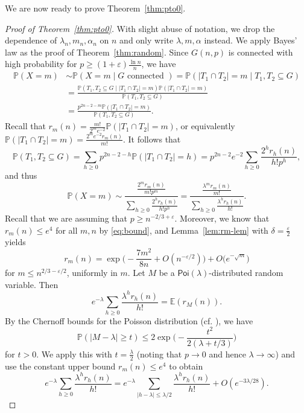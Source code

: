 \documentclass[a4paper,12pt,reqno]{amsart}
\theoremstyle{remark}
\newcommand{\Ex}{\mathbb{E}}
\newcommand{\IP}{\mathbb{P}}
\newcommand{\Poi}{\mathsf{Poi}}
\newcommand{\ssq}{\subseteq}
\newcommand{\ga}{\alpha}
\newcommand{\gep}{\varepsilon}
\newcommand{\gd}{\delta}
\newcommand{\gl}{\lambda}
\begin{document}
We are now ready to prove Theorem~\ref{thm:pto0}.

\begin{proof}[Proof of Theorem~\ref{thm:pto0}]
With slight abuse of notation, we drop the dependence of $\gl_n,m_n,\ga_n$ on $n$ and only write $\gl,m,\ga$ instead.
    We apply Bayes' law as the proof of Theorem~\ref{thm:random}. Since $G(n,p)$ is connected with high probability for $p\geq (1+\gep)\frac{\ln n}{n}$, we have
 \begin{align*}
  \IP(X=m) 
  &\sim \IP(X=m\mid G\text{ connected })
   = \IP(|T_1\cap T_2|=m \mid T_1,T_2\ssq G)\\
  &=\frac{\IP(T_1,T_2\ssq G \mid |T_1\cap T_2|=m)\IP(|T_1\cap T_2|=m)}{\IP(T_1,T_2\ssq G)}\\
  &= \frac{p^{2n-2-m}\IP(|T_1\cap T_2|=m)}{\IP(T_1,T_2\ssq G)}.
 \end{align*}
Recall that $r_m(n) = \frac{m!}{2^m e^{-2}} \IP(|T_1\cap T_2|=m)$, or equivalently $\IP(|T_1\cap T_2|=m) = \frac{2^m e^{-2}r_m(n)}{m!}$. It follows that
\[\IP(T_1,T_2\ssq G) = \sum_{h \geq 0} p^{2n-2-h} \IP(|T_1\cap T_2|=h) = p^{2n-2}e^{-2} \sum_{h \geq 0} \frac{2^h r_h(n)}{h!p^h},\]
and thus
\begin{equation}\label{eq:PX=m}
\IP(X=m) \sim \frac{\frac{2^m r_m(n)}{m!p^m}}{\sum_{h \geq 0} \frac{2^h r_h(n)}{h!p^h}} = \frac{\frac{\gl^m r_m(n)}{m!}}{\sum_{h \geq 0} \frac{\gl^h r_h(n)}{h!}}.
\end{equation}
 Recall that we are assuming that $p \geq n^{-2/3+\gep}$. Moreover, we know that $r_m(n)\leq e^4$ for all $m,n$ by \eqref{eq:bound}, and Lemma~\ref{lem:rm-lem} with $\gd = \frac{\gep}{2}$ yields
\begin{equation}\label{eq:rmn-asy}
    r_m(n) = \exp \Big( {-}\frac{7m^2}{8n} + O(n^{-\gep/2}) \Big) + O\big(e^{-\sqrt{m}}\big)
\end{equation}
for $m \leq n^{2/3-\gep/2}$, uniformly in $m$.
Let $M$ be a $\Poi(\gl)$-distributed random variable. Then
\[e^{-\gl} \sum_{h \geq 0} \frac{\gl^h r_h(n)}{h!} = \Ex(r_{M}(n)).\]
By the Chernoff bounds for the Poisson distribution (cf. \cite[Remark~2.6]{JLR00}), we have
 \begin{equation}\label{eq:chernoff-poi}
   \IP(|M-\gl|\geq t) \leq 2 \exp \Big( {-} \frac{t^2}{2(\gl+t/3)} \Big)
 \end{equation}
for $t>0$. We apply this with $t = \frac{\gl}{2}$ (noting that $p\to 0$ and hence $\gl\to\infty$) and use the constant upper bound $r_m(n)\leq e^4$ to obtain
\[e^{-\gl} \sum_{h \geq 0} \frac{\gl^h r_h(n)}{h!} = e^{-\gl} \sum_{|h-\gl| \leq \gl/2} \frac{\gl^h r_h(n)}{h!} + O(e^{-3\gl/28}).\]

\end{proof}
\end{document}
